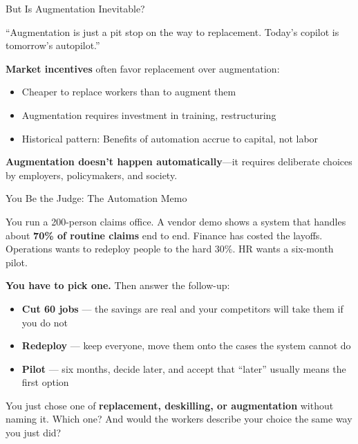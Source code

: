﻿\documentclass[aspectratio=169,11pt]{beamer}
\begin{document}
\begin{frame}{But Is Augmentation Inevitable?}
\begin{objectionbox}[Objection]
\small
``Augmentation is just a pit stop on the way to replacement. Today's copilot is tomorrow's autopilot.''
\end{objectionbox}

\vspace{0.2em}
\textbf{Market incentives} often favor replacement over augmentation:
\begin{itemize}
    \item Cheaper to replace workers than to augment them
    \item Augmentation requires investment in training, restructuring
    \item Historical pattern: Benefits of automation accrue to capital, not labor
\end{itemize}

\vspace{0.2em}
\textbf{Augmentation doesn't happen automatically}---it requires deliberate choices by employers, policymakers, and society.
\end{frame}
\begin{frame}[shrink=8]{You Be the Judge: The Automation Memo}
\begin{casestudybox}
\small
You run a 200-person claims office. A vendor demo shows a system that handles about \textbf{70\% of routine claims} end to end. Finance has costed the layoffs. Operations wants to redeploy people to the hard 30\%. HR wants a six-month pilot.
\end{casestudybox}

\textbf{You have to pick one.} Then answer the follow-up:
\begin{itemize}
    \item \textbf{Cut 60 jobs} --- the savings are real and your competitors will take them if you do not
    \item \textbf{Redeploy} --- keep everyone, move them onto the cases the system cannot do
    \item \textbf{Pilot} --- six months, decide later, and accept that ``later'' usually means the first option
\end{itemize}

\begin{discussionbox}
You just chose one of \textbf{replacement, deskilling, or augmentation} without naming it. Which one? And would the workers describe your choice the same way you just did?
\end{discussionbox}
\end{frame}
\end{document}
